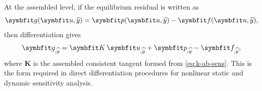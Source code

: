 
At the assembled level, if the equilibrium residual is written as
\begin{equation}
\bm{g}(\ModelState,\HostParameter)=\bm{p}(\ModelState,\HostParameter)-\bm{f}(\ModelState,\HostParameter),
\label{eq:residual-sens}
\end{equation}
then differentiation gives
\begin{equation}
\bm{g}_{,\HostParameter}
=
\bm{K}\,\ModelState_{,\HostParameter}
+
\bm{p}_{;\HostParameter}
-
\bm{f}_{,\HostParameter},
\label{eq:residual-sens-final}
\end{equation}
where \(\bm{K}\) is the assembled consistent tangent formed from \eqref{eq:k-ab-sens}. 
This is the form required in direct differentiation procedures for nonlinear static and dynamic sensitivity analysis.
